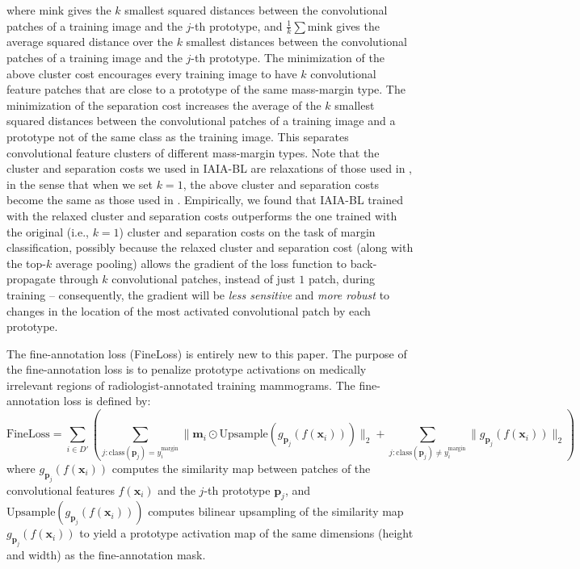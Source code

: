 \documentclass[11pt]{article}
\begin{document}
where $\mathrm{mink}$ gives the $k$ smallest squared distances between the convolutional patches of a training image and the $j$-th prototype, and $\frac{1}{k}\sum\mathrm{mink}$ gives the average squared distance over the $k$ smallest distances between the convolutional patches of a training image and the $j$-th prototype. The minimization of the above cluster cost encourages every training image to have $k$ convolutional feature patches that are close to a prototype of the same mass-margin type. The minimization of the separation cost increases the average of the $k$ smallest squared distances between the convolutional patches of a training image and a prototype not of the same class as the training image. This separates convolutional feature clusters of different mass-margin types. Note that the cluster and separation costs we used in IAIA-BL are relaxations of those used in \cite{PPNet}, in the sense that when we set $k = 1$, the above cluster and separation costs become the same as those used in \cite{PPNet}. Empirically, we found that IAIA-BL trained with the relaxed cluster and separation costs outperforms the one trained with the original (i.e., $k=1$) cluster and separation costs on the task of margin classification, possibly because the relaxed cluster and separation cost (along with the top-$k$ average pooling) allows the gradient of the loss function to back-propagate through $k$ convolutional patches, instead of just $1$ patch, during training -- consequently, the gradient will be \textit{less sensitive} and \textit{more robust} to changes in the location of the most activated convolutional patch by each prototype.

The fine-annotation loss (FineLoss) is entirely new to this paper. The purpose of the fine-annotation loss is to penalize prototype activations on medically irrelevant regions of radiologist-annotated training mammograms. The fine-annotation loss is defined by:
\begin{equation}
\textrm{FineLoss} = \sum_{i \in D'}  \left(\sum_{j: \text{class}(\mathbf{p}_j) = y^{\text{margin}}_i} \|\mathbf{m}_i \odot \textrm{Upsample}(g_{\mathbf{p}_j}(f(\mathbf{x}_i)))\|_2
+ \sum_{j: \text{class}(\mathbf{p}_j) \neq y^{\text{margin}}_i} \|g_{\mathbf{p}_j}(f(\mathbf{x}_i))\|_2\right)
\end{equation}
where $g_{\mathbf{p}_j}(f(\mathbf{x}_i))$ computes the similarity map between patches of the convolutional features $f(\mathbf{x}_i)$ and the $j$-th prototype $\mathbf{p}_j$, and $\textrm{Upsample}(g_{\mathbf{p}_j}(f(\mathbf{x}_i)))$ computes bilinear upsampling of the similarity map $g_{\mathbf{p}_j}(f(\mathbf{x}_i))$ to yield a prototype activation map of the same dimensions (height and width) as the fine-annotation mask. 
\end{document}
